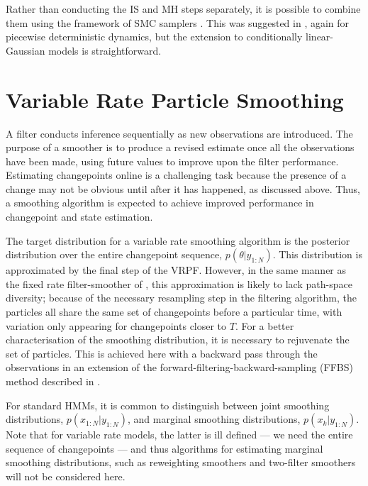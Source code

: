 \documentclass[10pt,twocolumn,twoside]{IEEEtran}
\begin{document}
Rather than conducting the IS and MH steps separately, it is possible to combine them using the framework of SMC samplers \cite{DelMoral2006}. This was suggested in \cite{Whiteley2011}, again for piecewise deterministic dynamics, but the extension to conditionally linear-Gaussian models is straightforward.



\section{Variable Rate Particle Smoothing} \label{sec:vrps}

A filter conducts inference sequentially as new observations are introduced. The purpose of a smoother is to produce a revised estimate once all the observations have been made, using future values to improve upon the filter performance. Estimating changepoints online is a challenging task because the presence of a change may not be obvious until after it has happened, as discussed above. Thus, a smoothing algorithm is expected to achieve improved performance in changepoint and state estimation.

The target distribution for a variable rate smoothing algorithm is the posterior distribution over the entire changepoint sequence, $p(\theta|y_{1:N})$. This distribution is approximated by the final step of the VRPF. However, in the same manner as the fixed rate filter-smoother of \cite{Kitagawa1996}, this approximation is likely to lack path-space diversity; because of the necessary resampling step in the filtering algorithm, the particles all share the same set of changepoints before a particular time, with variation only appearing for changepoints closer to $T$. For a better characterisation of the smoothing distribution, it is necessary to rejuvenate the set of particles. This is achieved here with a backward pass through the observations in an extension of the forward-filtering-backward-sampling (FFBS) method described in \cite{Godsill2004}.%

For standard HMMs, it is common to distinguish between joint smoothing distributions, $p(x_{1:N}|y_{1:N})$, and marginal smoothing distributions, $p(x_k|y_{1:N})$. Note that for variable rate models, the latter is ill defined --- we need the entire sequence of changepoints --- and thus algorithms for estimating marginal smoothing distributions, such as reweighting smoothers \cite{Doucet2000} and two-filter smoothers \cite{Briers2010,Fearnhead2010} will not be considered here.
\end{document}
